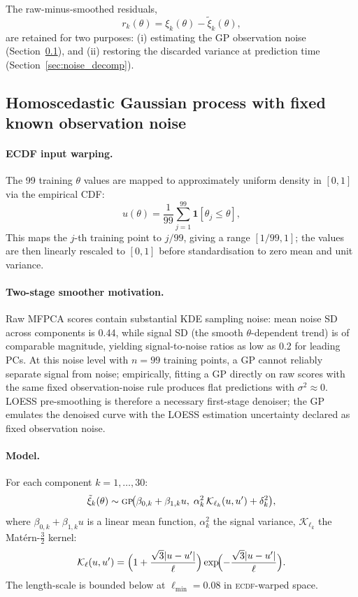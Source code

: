 \documentclass[12pt,a4paper]{article}
\newcommand{\GP}{\textsc{gp}}
\newcommand{\ECDF}{\textsc{ecdf}}
\newcommand{\calK}{\mathcal{K}}
\newcommand{\spar}{\theta}
\begin{document}
The raw-minus-smoothed residuals,
\begin{equation}
  r_k(\spar)=\xi_k(\spar)-\tilde{\xi}_k(\spar),
  \label{eq:residuals}
\end{equation}
are retained for two purposes: (i) estimating the GP observation noise
(Section~\ref{sec:gp}), and (ii) restoring the discarded variance at
prediction time (Section~\ref{sec:noise_decomp}).

\subsection{Homoscedastic Gaussian process with fixed known observation noise}
\label{sec:gp}

\paragraph{ECDF input warping.}
The 99 training $\spar$ values are mapped to approximately uniform
density in $[0,1]$ via the empirical CDF:
\begin{equation}
  u(\spar)=\frac{1}{99}\sum_{j=1}^{99}\mathbf{1}[\theta_j\le\spar],
  \label{eq:ecdf}
\end{equation}
This maps the $j$-th training point to $j/99$, giving a range $[1/99,1]$; the values are then linearly rescaled to $[0,1]$ before standardisation to zero mean and unit variance.

\paragraph{Two-stage smoother motivation.}
Raw MFPCA scores contain substantial KDE sampling noise: mean
noise SD across components is 0.44, while signal SD (the smooth
$\spar$-dependent trend) is of comparable magnitude, yielding
signal-to-noise ratios as low as 0.2 for leading PCs.  At this
noise level with $n=99$ training points, a GP cannot reliably
separate signal from noise; empirically, fitting a GP directly on raw
scores with the same fixed observation-noise rule produces flat predictions with
$\sigma^2\approx0$.  LOESS pre-smoothing is therefore a necessary
first-stage denoiser; the GP emulates the denoised curve with the
LOESS estimation uncertainty declared as fixed observation noise.

\paragraph{Model.}
For each component $k=1,\ldots,30$:
\begin{equation}
  \tilde{\xi}_k(\spar)\sim\GP\!\bigl(\beta_{0,k}+\beta_{1,k}u,\;
    \alpha_k^2\,\calK_{\ell_k}(u,u')+\delta_k^2\bigr),
  \label{eq:gp}
\end{equation}
where $\beta_{0,k}+\beta_{1,k}u$ is a linear mean function,
$\alpha_k^2$ the signal variance, $\calK_{\ell_k}$ the
Mat\'{e}rn-$\tfrac{3}{2}$ kernel:
\begin{equation}
  \calK_\ell(u,u')=
  \Bigl(1+\frac{\sqrt{3}|u-u'|}{\ell}\Bigr)
  \exp\!\Bigl(-\frac{\sqrt{3}|u-u'|}{\ell}\Bigr).
  \label{eq:matern32}
\end{equation}
The length-scale is bounded below at $\ell_\mathrm{min}=0.08$ in
\ECDF-warped space.
\end{document}
